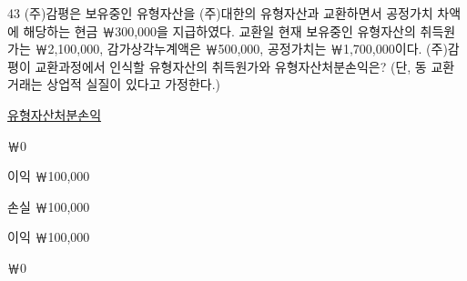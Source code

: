 \begin{question}{43}
(주)감평은 보유중인 유형자산을 (주)대한의 유형자산과 교환하면서 공정가치 차액에 해당하는 현금 ￦300,000을 지급하였다. 교환일 현재 보유중인 유형자산의 취득원가는 ￦2,100,000, 감가상각누계액은 ￦500,000, 공정가치는 ￦1,700,000이다. (주)감평이 교환과정에서 인식할 유형자산의 취득원가와 유형자산처분손익은? (단, 동 교환거래는 상업적 실질이 있다고 가정한다.)

\noindent\hspace*{2em}\uline{유형자산처분손익}\par
\begin{choices}
  \item {}￦0
  \item {}이익 ￦100,000
  \item {}손실 ￦100,000
  \item {}이익 ￦100,000
  \item {}￦0
\end{choices}
\end{question}
